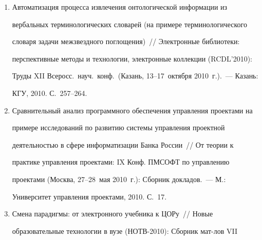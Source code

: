 \begin{enumerate}[1.]
Российской единой коллекции цифровых образовательных ресурсов~/\!\!/  


Информатизация образования~--- 2010: Мат-лы Междунар.\ 


науч.-метод.\ конф.\ (Кострома, 14--17~июня 2010~г.).~--- Кострома: 


КГУ им.\ Н.\,А.~Некрасова, 2010. С.~328--333.





\item {}


Автоматизация процесса извлечения онтологической информации из 


вербальных терминологических словарей (на примере терминологического 


словаря задачи межзвездного поглощения)~/\!\!/  Электронные библиотеки: 


перспективные методы и технологии, электронные коллекции (RCDL'2010): 


Труды XII Всеросс.\ науч.\ конф.\ (Казань, 13--17~октября 2010~г.).~--- Казань: 


КГУ, 2010. С.~257--264.





\item {}


Сравнительный анализ программного обеспечения управления проектами на 


примере исследований по развитию сис\-темы управления проектной 


деятельностью в сфере информатизации Банка России~/\!\!/  От теории к 


практике управления проектами: IX Конф. ПМСОФТ по управлению 


проектами (Москва, 27--28~мая 2010~г.): Сборник докладов.~--- М.: 


Университет управления проектами, 2010. С.~17.








\item {}


Смена парадигмы: от электронного учебника к ЦОРу~/\!\!/  Новые 


образовательные технологии в вузе (НОТВ-2010): Сборник мат-лов VII 



\end{enumerate}
